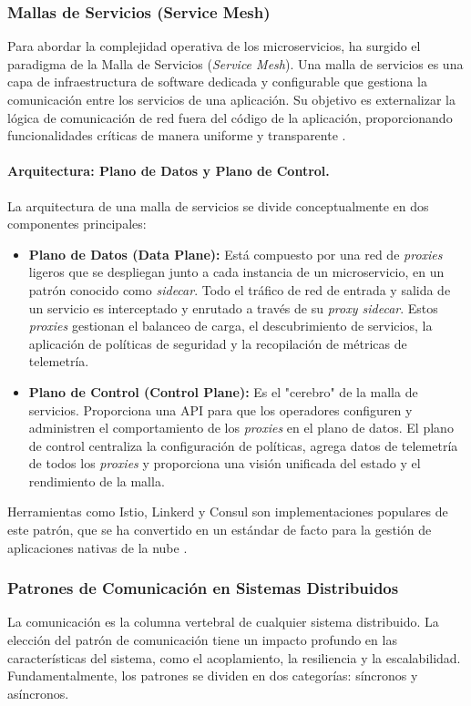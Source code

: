 \subsubsection{Mallas de Servicios (Service Mesh)}
Para abordar la complejidad operativa de los microservicios, ha surgido el paradigma de la Malla de Servicios (\textit{Service Mesh}). Una malla de servicios es una capa de infraestructura de software dedicada y configurable que gestiona la comunicación entre los servicios de una aplicación. Su objetivo es externalizar la lógica de comunicación de red fuera del código de la aplicación, proporcionando funcionalidades críticas de manera uniforme y transparente \cite{Calcote2019}.

\paragraph{Arquitectura: Plano de Datos y Plano de Control.}
La arquitectura de una malla de servicios se divide conceptualmente en dos componentes principales:
\begin{itemize}
    \item \textbf{Plano de Datos (Data Plane):} Está compuesto por una red de \textit{proxies} ligeros que se despliegan junto a cada instancia de un microservicio, en un patrón conocido como \textit{sidecar}. Todo el tráfico de red de entrada y salida de un servicio es interceptado y enrutado a través de su \textit{proxy sidecar}. Estos \textit{proxies} gestionan el balanceo de carga, el descubrimiento de servicios, la aplicación de políticas de seguridad y la recopilación de métricas de telemetría.
    \item \textbf{Plano de Control (Control Plane):} Es el "cerebro" de la malla de servicios. Proporciona una API para que los operadores configuren y administren el comportamiento de los \textit{proxies} en el plano de datos. El plano de control centraliza la configuración de políticas, agrega datos de telemetría de todos los \textit{proxies} y proporciona una visión unificada del estado y el rendimiento de la malla.
\end{itemize}
Herramientas como Istio, Linkerd y Consul son implementaciones populares de este patrón, que se ha convertido en un estándar de facto para la gestión de aplicaciones nativas de la nube \cite{gancarski2021survey}.

\subsubsection{Patrones de Comunicación en Sistemas Distribuidos}
La comunicación es la columna vertebral de cualquier sistema distribuido. La elección del patrón de comunicación tiene un impacto profundo en las características del sistema, como el acoplamiento, la resiliencia y la escalabilidad. Fundamentalmente, los patrones se dividen en dos categorías: síncronos y asíncronos.

